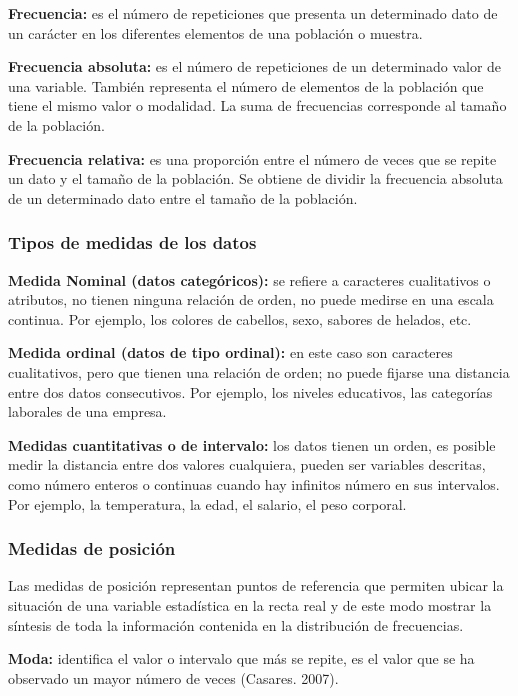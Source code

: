 \documentclass[a5paper,doc,10pt,noapacite]{apa6}
\begin{document}
{{\textbf{Frecuencia:} es el número de repeticiones que presenta un determinado dato de un carácter en los diferentes elementos de una población o muestra.

\textbf{Frecuencia absoluta:} es el número de repeticiones de un determinado valor de una variable. También representa el número de elementos de la población que tiene el mismo valor o modalidad. La suma de frecuencias corresponde al tamaño de la población.

\textbf{Frecuencia relativa:} es una proporción entre el número de veces que se repite un dato y el tamaño de la población. Se obtiene de dividir la frecuencia absoluta de un determinado dato entre el tamaño de la población.  

\subsubsection{Tipos de medidas de los datos}

\textbf{Medida Nominal (datos categóricos):} se refiere a caracteres cualitativos o atributos, no tienen ninguna relación de orden, no puede medirse en una escala continua. Por ejemplo, los colores de cabellos, sexo, sabores de helados, etc.

\textbf{Medida ordinal (datos de tipo ordinal):} en este caso son caracteres cualitativos, pero que tienen una relación de orden; no puede fijarse una distancia entre dos datos consecutivos. Por ejemplo, los niveles educativos, las categorías laborales de una empresa.

\textbf{Medidas cuantitativas o de intervalo:} los datos tienen un orden, es posible medir la distancia entre dos valores cualquiera, pueden ser variables descritas, como número enteros o continuas cuando hay infinitos número en sus intervalos. Por ejemplo, la temperatura, la edad, el salario,
el peso corporal.

\subsubsection{Medidas de posición}

Las medidas de posición representan puntos de referencia que permiten ubicar la situación de una variable estadística en la recta real y de este modo mostrar la síntesis de toda la información contenida en la distribución de frecuencias.

\textbf{Moda:} identifica el valor o intervalo que más se repite, es el valor que se ha observado un mayor número de veces (Casares. 2007).

}}
\end{document}

